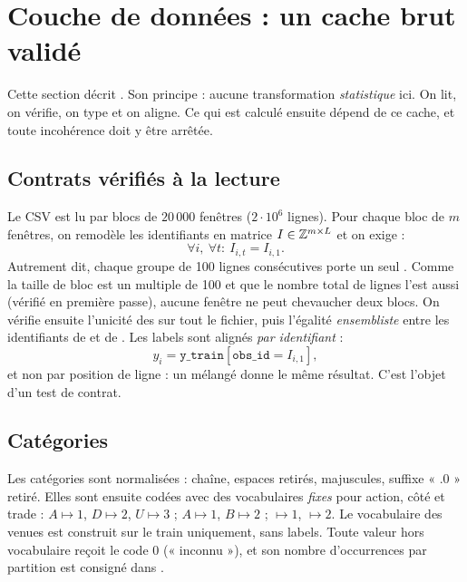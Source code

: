 \section{Couche de données : un cache brut validé}\label{sec:donnees}

Cette section décrit . Son principe : aucune transformation \emph{statistique} ici. On lit, on vérifie, on type et on aligne. Ce qui est calculé ensuite dépend de ce cache, et toute incohérence doit y être arrêtée.

\subsection{Contrats vérifiés à la lecture}
Le CSV est lu par blocs de $20\,000$ fenêtres ($2\cdot10^6$ lignes). Pour chaque bloc de $m$ fenêtres, on remodèle les identifiants en matrice $I\in\mathbb{Z}^{m\times L}$ et on exige :
\begin{equation}
\forall i,\ \forall t:\ I_{i,t}=I_{i,1}.
\end{equation}
Autrement dit, chaque groupe de 100 lignes consécutives porte un seul . Comme la taille de bloc est un multiple de 100 et que le nombre total de lignes l'est aussi (vérifié en première passe), aucune fenêtre ne peut chevaucher deux blocs. On vérifie ensuite l'unicité des  sur tout le fichier, puis l'égalité \emph{ensembliste} entre les identifiants de  et de . Les labels sont alignés \emph{par identifiant} :
\begin{equation}
y_i=\texttt{y\_train}[\texttt{obs\_id}=I_{i,1}],
\end{equation}
et non par position de ligne : un  mélangé donne le même résultat. C'est l'objet d'un test de contrat.

\subsection{Catégories}
Les catégories sont normalisées : chaîne, espaces retirés, majuscules, suffixe « .0 » retiré. Elles sont ensuite codées avec des vocabulaires \emph{fixes} pour action, côté et trade : $A\mapsto1$, $D\mapsto2$, $U\mapsto3$ ; $A\mapsto1$, $B\mapsto2$ ; $\mapsto1$, $\mapsto2$. Le vocabulaire des venues est construit sur le train uniquement, sans labels. Toute valeur hors vocabulaire reçoit le code $0$ (« inconnu »), et son nombre d'occurrences par partition est consigné dans .

